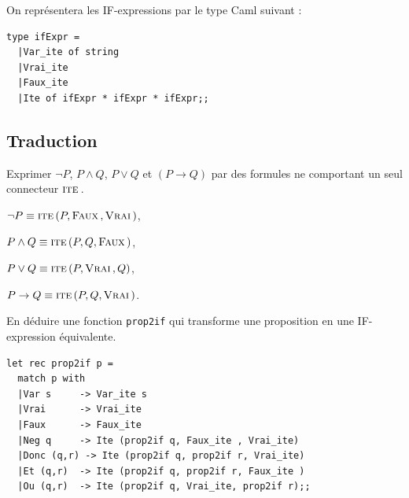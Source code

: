On représentera les IF-expressions par le type Caml suivant :
\begin{lstlisting}
type ifExpr =
  |Var_ite of string
  |Vrai_ite
  |Faux_ite
  |Ite of ifExpr * ifExpr * ifExpr;;
\end{lstlisting}
\subsection{Traduction}
\begin{Exercise}\it 

Exprimer $\neg P$, $P \land Q$, $P \lor Q$ et $(P \rightarrow Q)$ par des formules ne comportant un seul connecteur $\text{\sc ite}\,$.
\end{Exercise}
\begin{Answer} $\neg P\equiv \text{\sc ite}\,(P,\text{\sc Faux}\,,\text{\sc Vrai}\,)$, 

$P \land Q\equiv \text{\sc ite}\,(P,Q,\text{\sc Faux}\,)$, 

$P \lor Q\equiv \text{\sc ite}\,(P,\text{\sc Vrai}\,,Q)$, 

$P \rightarrow Q\equiv \text{\sc ite}\,(P,Q,\text{\sc Vrai}\,)$.
\end{Answer}
\begin{Exercise}\it 

En déduire une fonction {\tt  prop2if} qui transforme une proposition en une IF-expression équivalente.
\end{Exercise}
\begin{Answer} 
\begin{lstlisting}
let rec prop2if p =
  match p with
  |Var s     -> Var_ite s
  |Vrai      -> Vrai_ite
  |Faux      -> Faux_ite
  |Neg q     -> Ite (prop2if q, Faux_ite , Vrai_ite)
  |Donc (q,r) -> Ite (prop2if q, prop2if r, Vrai_ite)
  |Et (q,r)  -> Ite (prop2if q, prop2if r, Faux_ite )
  |Ou (q,r)  -> Ite (prop2if q, Vrai_ite, prop2if r);;
\end{lstlisting}
\end{Answer}
